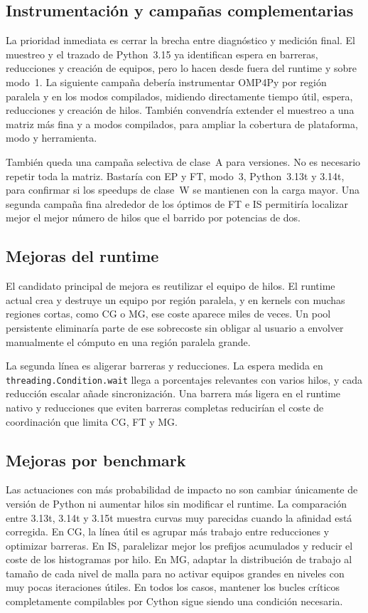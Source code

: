 \subsection{Instrumentación y campañas complementarias}
La prioridad inmediata es cerrar la brecha entre diagnóstico y medición final.
El muestreo y el trazado de Python~3.15 ya identifican espera en barreras,
reducciones y creación de equipos, pero lo hacen desde fuera del runtime y sobre
modo~1. La siguiente campaña debería instrumentar OMP4Py por región paralela y en
los modos compilados, midiendo directamente tiempo útil, espera, reducciones y
creación de hilos. También convendría extender el muestreo a una matriz más fina
y a modos compilados, para ampliar la cobertura de plataforma, modo y
herramienta.

También queda una campaña selectiva de clase~A para versiones. No es necesario
repetir toda la matriz. Bastaría con EP y FT, modo~3, Python~3.13t y 3.14t, para
confirmar si los speedups de clase~W se mantienen con la carga mayor. Una segunda
campaña fina alrededor de los óptimos de FT e IS permitiría localizar mejor el
mejor número de hilos que el barrido por potencias de dos.

\subsection{Mejoras del runtime}
El candidato principal de mejora es reutilizar el equipo de hilos. El runtime
actual crea y destruye un equipo por región paralela, y en kernels con muchas
regiones cortas, como CG o MG, ese coste aparece miles de veces. Un pool
persistente eliminaría parte de ese sobrecoste sin obligar al usuario a envolver
manualmente el cómputo en una región paralela grande.

La segunda línea es aligerar barreras y reducciones. La espera medida en
\texttt{threading.Condition.wait} llega a porcentajes relevantes con varios
hilos, y cada reducción escalar añade sincronización. Una barrera más ligera en
el runtime nativo y reducciones que eviten barreras completas reducirían el coste
de coordinación que limita CG, FT y MG.

\subsection{Mejoras por benchmark}
Las actuaciones con más probabilidad de impacto no son cambiar únicamente de
versión de Python ni aumentar hilos sin modificar el runtime. La comparación
entre 3.13t, 3.14t y 3.15t muestra curvas muy parecidas cuando la afinidad está
corregida. En CG, la línea útil es agrupar más trabajo entre reducciones y
optimizar barreras. En IS, paralelizar mejor los prefijos acumulados y reducir el
coste de los histogramas por hilo. En MG, adaptar la distribución de trabajo al
tamaño de cada nivel de malla para no activar equipos grandes en niveles con muy
pocas iteraciones útiles. En todos los casos, mantener los bucles críticos
completamente compilables por Cython sigue siendo una condición necesaria.

